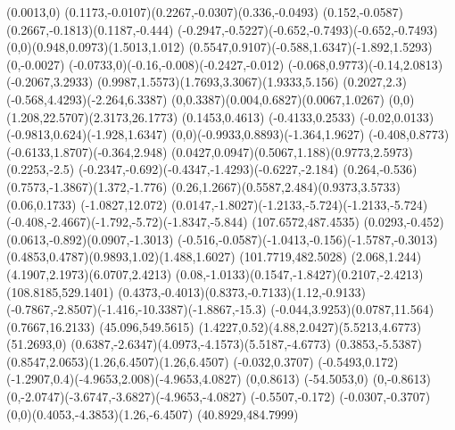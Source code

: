 {    \rlineto(0.0013,0)
    \rcurveto(0.1173,-0.0107)(0.2267,-0.0307)(0.336,-0.0493)
    \rcurveto(0.152,-0.0587)(0.2667,-0.1813)(0.1187,-0.444)
    \rcurveto(-0.2947,-0.5227)(-0.652,-0.7493)(-0.652,-0.7493)
    \rcurveto(0,0)(0.948,0.0973)(1.5013,1.012)
    \rcurveto(0.5547,0.9107)(-0.588,1.6347)(-1.892,1.5293)
    \rlineto(0,-0.0027)
    \rcurveto(-0.0733,0)(-0.16,-0.008)(-0.2427,-0.012)
    \rcurveto(-0.068,0.9773)(-0.14,2.0813)(-0.2067,3.2933)
    \rcurveto(0.9987,1.5573)(1.7693,3.3067)(1.9333,5.156)
    \rcurveto(0.2027,2.3)(-0.568,4.4293)(-2.264,6.3387)
    \rcurveto(0,0.3387)(0.004,0.6827)(0.0067,1.0267)
    \rcurveto(0,0)(1.208,22.5707)(2.3173,26.1773)
    \rlineto(0.1453,0.4613)
    \rlineto(-0.4133,0.2533)
    \rcurveto(-0.02,0.0133)(-0.9813,0.624)(-1.928,1.6347)
    \rcurveto(0,0)(-0.9933,0.8893)(-1.364,1.9627)
    \rcurveto(-0.408,0.8773)(-0.6133,1.8707)(-0.364,2.948)
    \rcurveto(0.0427,0.0947)(0.5067,1.188)(0.9773,2.5973)
    \rlineto(0.2253,-2.5)
    \rcurveto(-0.2347,-0.692)(-0.4347,-1.4293)(-0.6227,-2.184)
    \rcurveto(0.264,-0.536)(0.7573,-1.3867)(1.372,-1.776)
    \rcurveto(0.26,1.2667)(0.5587,2.484)(0.9373,3.5733)
    \rlineto(0.06,0.1733)
    \rlineto(-1.0827,12.072)
    \rcurveto(0.0147,-1.8027)(-1.2133,-5.724)(-1.2133,-5.724)
    \rcurveto(-0.408,-2.4667)(-1.792,-5.72)(-1.8347,-5.844)
    \moveto(107.6572,487.4535)
    \rcurveto(0.0293,-0.452)(0.0613,-0.892)(0.0907,-1.3013)
    \rcurveto(-0.516,-0.0587)(-1.0413,-0.156)(-1.5787,-0.3013)
    \rcurveto(0.4853,0.4787)(0.9893,1.02)(1.488,1.6027)
    \moveto(101.7719,482.5028)
    \rcurveto(2.068,1.244)(4.1907,2.1973)(6.0707,2.4213)
    \rcurveto(0.08,-1.0133)(0.1547,-1.8427)(0.2107,-2.4213)
    \closepath
    \moveto(108.8185,529.1401)
    \rcurveto(0.4373,-0.4013)(0.8373,-0.7133)(1.12,-0.9133)
    \rcurveto(-0.7867,-2.8507)(-1.416,-10.3387)(-1.8867,-15.3)
    \rcurveto(-0.044,3.9253)(0.0787,11.564)(0.7667,16.2133)
    \closepath
    \moveto(45.096,549.5615)
    \rcurveto(1.4227,0.52)(4.88,2.0427)(5.5213,4.6773)
    \rlineto(51.2693,0)
    \rcurveto(0.6387,-2.6347)(4.0973,-4.1573)(5.5187,-4.6773)
    \rlineto(0.3853,-5.5387)
    \rcurveto(0.8547,2.0653)(1.26,6.4507)(1.26,6.4507)
    \rlineto(-0.032,0.3707)
    \rlineto(-0.5493,0.172)
    \rcurveto(-1.2907,0.4)(-4.9653,2.008)(-4.9653,4.0827)
    \rlineto(0,0.8613)
    \rlineto(-54.5053,0)
    \rlineto(0,-0.8613)
    \rcurveto(0,-2.0747)(-3.6747,-3.6827)(-4.9653,-4.0827)
    \rlineto(-0.5507,-0.172)
    \rlineto(-0.0307,-0.3707)
    \rcurveto(0,0)(0.4053,-4.3853)(1.26,-6.4507)
    \closepath
    \moveto(40.8929,484.7999)
}
